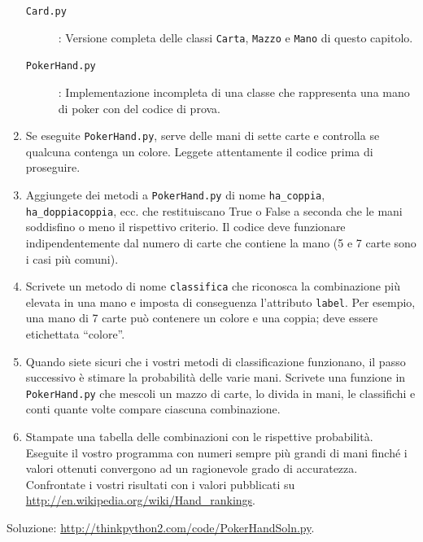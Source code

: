 \documentclass[10pt]{book}
\begin{document}
\begin{exercise}
\begin{enumerate}
\begin{description}

\item[{\tt Card.py}]: Versione completa delle classi {\tt Carta},
{\tt Mazzo} e {\tt Mano} di questo capitolo.

\item[{\tt PokerHand.py}]: Implementazione incompleta di una classe che rappresenta una mano di poker con del codice di prova.


\end{description}
%
\item Se eseguite {\tt PokerHand.py}, serve delle mani di sette carte e controlla se qualcuna contenga un colore. Leggete attentamente il codice prima di proseguire.

\item Aggiungete dei metodi a {\tt PokerHand.py} di nome \verb"ha_coppia",
\verb"ha_doppiacoppia", ecc. che restituiscano True o False a seconda che le mani soddisfino o meno il rispettivo criterio. Il codice deve funzionare indipendentemente dal numero di carte che contiene la mano (5 e 7 carte sono i casi più comuni).

\item Scrivete un metodo di nome {\tt classifica} che riconosca la combinazione più elevata in una mano e imposta di conseguenza l'attributo
{\tt label}.  Per esempio, una mano di 7 carte può contenere un colore e una coppia; deve essere etichettata ``colore''.

\item Quando siete sicuri che i vostri metodi di classificazione funzionano, il passo successivo è stimare la probabilità delle varie mani. Scrivete una funzione in {\tt PokerHand.py} che mescoli un mazzo di carte, lo divida in mani, le classifichi e conti quante volte compare ciascuna combinazione.

\item Stampate una tabella delle combinazioni con le rispettive probabilità. Eseguite il vostro programma con numeri sempre più grandi di mani finché i valori ottenuti convergono ad un ragionevole grado di accuratezza. Confrontate i vostri risultati con i valori pubblicati su \url{http://en.wikipedia.org/wiki/Hand_rankings}.

\end{enumerate}

Soluzione: \url{http://thinkpython2.com/code/PokerHandSoln.py}.
\end{exercise}
\end{document}
